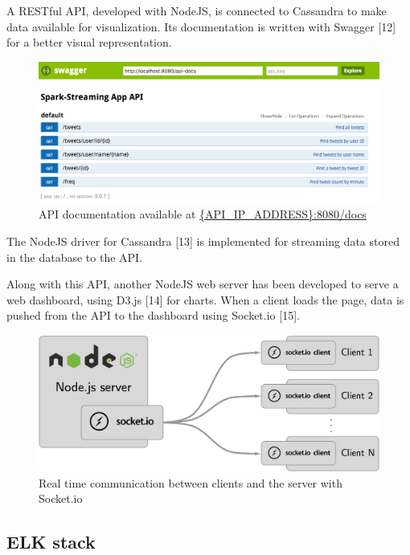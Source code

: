 \documentclass[11pt]{article}
\begin{document}
A RESTful API, developed with \textsf{NodeJS}, is connected to \textsf{Cassandra} to make data available for visualization. 
Its documentation is written with \textsf{Swagger} [12] for a better visual representation.

\begin{figure}[h!]
    \centering
    \includegraphics[scale=0.38]{img/api-docs.png}
    \caption{API documentation available at \url{{API_IP_ADDRESS}:8080/docs}}
    \label{socket}
\end{figure}

The \textsf{NodeJS} driver for \textsf{Cassandra} [13] is implemented for streaming data stored in the database to the API.

Along with this API, another \textsf{NodeJS} web server has been developed to serve a web dashboard, using \textsf{D3.js} [14] for charts. When a client loads the page, data is pushed from the API to the dashboard using \textsf{Socket.io} [15].

\begin{figure}[h!]
    \centering
    \includegraphics[scale=0.11]{img/api-dashboard-socket.png}
    \caption{Real time communication between clients and the server with \textsf{Socket.io}}
    \label{socket}
\end{figure}

\newpage
\subsection{ELK stack}
\end{document}
